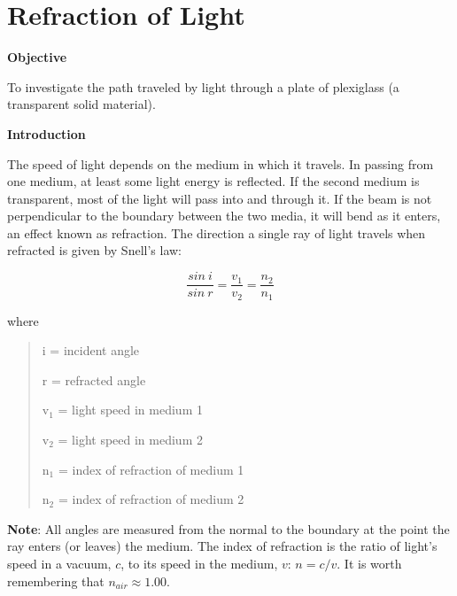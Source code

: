 
\section{Refraction of Light}

\makelabheader %

\textbf{Objective}

To investigate the path traveled by light through a plate of plexiglass
(a transparent solid material).

\textbf{Introduction}

The speed of light depends on the medium in which it travels. In passing
from one medium, at least some light energy is reflected. If the second
medium is transparent, most of the light will pass into and through
it. If the beam is not perpendicular to the boundary between the two
media, it will bend as it enters, an effect known as refraction. The
direction a single ray of light travels when refracted is given by
Snell's law:

\begin{displaymath} \frac{sin~i}{sin~r} = \frac{v_1}{v_2} = \frac{n_2}{n_1} \end{displaymath}

where

\begin{quote}
i = incident angle

r = refracted angle

v\( _{1} \) = light speed in medium 1

v\( _{2} \) = light speed in medium 2

n\( _{1} \) = index of refraction of medium 1 

n\( _{2} \) = index of refraction of medium 2
\end{quote}
\textbf{Note}: All angles are measured from the normal to the boundary
at the point the ray enters (or leaves) the medium. The index of refraction is
the ratio of light's speed in a vacuum, $c$, to its speed in the medium,
$v$: $n = c / v$. It is worth remembering that $n_{air} \approx 1.00$.


